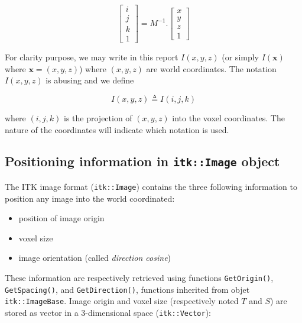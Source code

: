 \begin{equation}
\begin{bmatrix} i \\ j \\ k \\ 1 \end{bmatrix}
=
M^{-1}.
\begin{bmatrix} x \\ y \\ z \\ 1 \end{bmatrix}
\end{equation}


For clarity purpose, we may write in this report $I(x,y,z)$ (or simply $I(\mathbf{x})$ where $\mathbf{x}=(x,y,z)$) where $(x,y,z)$ are world coordinates. The notation $I(x,y,z)$ is abusing and we define  

\begin{equation}
I(x,y,z) \triangleq I(i,j,k)
\end{equation}

where $(i,j,k)$ is the projection of $(x,y,z)$ into the voxel coordinates. The nature of the coordinates will indicate which notation is used.



\subsection{Positioning information in \texttt{itk::Image} object}
\label{subsec:images:position:itk}


The ITK image format (\texttt{itk::Image}) contains the three following information to position any image into the world coordinated:

\begin{itemize}
\item position of image origin
\item voxel size
\item image orientation (called \textit{direction cosine})
\end{itemize}

These information are respectively retrieved using functions \texttt{GetOrigin()}, \texttt{GetSpacing()}, and \texttt{GetDirection()}, functions inherited from objet \texttt{itk::ImageBase}. Image origin and voxel size (respectively noted $T$ and $S$) are stored as vector in a 3-dimensional space (\texttt{itk::Vector}):

